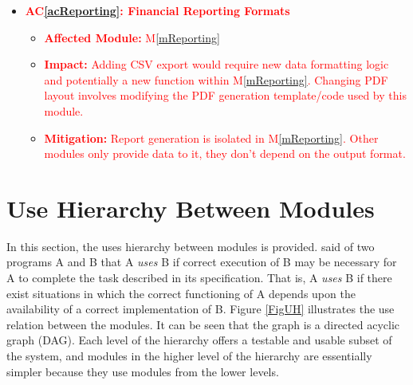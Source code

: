 \documentclass[12pt, titlepage]{article}
\newcommand{\acref}[1]{AC\ref{#1}}
\newcommand{\mref}[1]{M\ref{#1}}
\begin{document}
\begin{itemize}
    \item \textbf{\textcolor{red}{\acref{acReporting}: Financial Reporting Formats}}
    \begin{itemize}
        \item \textbf{\textcolor{red}{Affected Module:}} \textcolor{red}{\mref{mReporting}}
        \item \textbf{\textcolor{red}{Impact:}} \textcolor{red}{Adding CSV export would require new data formatting logic and potentially a new function within \mref{mReporting}. Changing PDF layout involves modifying the PDF generation template/code used by this module.}
        \item \textbf{\textcolor{red}{Mitigation:}} \textcolor{red}{Report generation is isolated in \mref{mReporting}. Other modules only provide data to it, they don't depend on the output format.}
    \end{itemize}
\end{itemize}


\section{Use Hierarchy Between Modules} \label{SecUse}

In this section, the uses hierarchy between modules is
provided. \citet{Parnas1978} said of two programs A and B that A {\em uses} B if
correct execution of B may be necessary for A to complete the task described in
its specification. That is, A {\em uses} B if there exist situations in which
the correct functioning of A depends upon the availability of a correct
implementation of B. Figure \ref{FigUH} illustrates the use relation between
the modules. It can be seen that the graph is a directed acyclic graph
(DAG). Each level of the hierarchy offers a testable and usable subset of the
system, and modules in the higher level of the hierarchy are essentially simpler
because they use modules from the lower levels.
\end{document}
